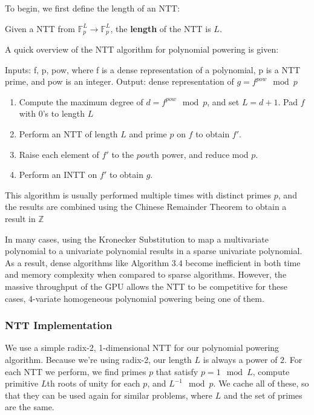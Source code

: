 To begin, we first define the length of an NTT:

\begin{defn}
    Given a NTT from $\mathbb{F}_p^L \rightarrow \mathbb{F}_p^L$, the \textbf{length} of the NTT is $L$.
\end{defn}

A quick overview of the NTT algorithm for polynomial powering is given:

\begin{alg} Inputs: f, p, pow, where f is a dense representation of a 
polynomial, p is a NTT prime, and pow is an integer.
Output: dense representation of $g = f ^ {pow} \mod p$

\begin{enumerate}
    \item Compute the maximum degree of $d = f ^ {pow} \mod p$, and set $L = d + 1$. Pad $f$ with $0$'s to length $L$
    \item Perform an NTT of length $L$ and prime $p$ on $f$ to obtain $f'$.
    \item Raise each element of $f'$ to the $pow$th power, and reduce mod $p$.
    \item Perform an INTT on $f'$ to obtain $g$.
\end{enumerate}

\end{alg}

This algorithm is usually performed multiple times with distinct primes $p$, and the results are combined using the Chinese Remainder Theorem to obtain a result in $\mathbb{Z}$

In many cases, using the Kronecker Substitution to map a multivariate polynomial to a univariate polynomial results in  a sparse univariate polynomial. As a result, dense algorithms like Algorithm 3.4 become inefficient in both time and memory complexity when compared to sparse algorithms. However, the massive throughput of the GPU allows the NTT to be competitive for these cases, $4$-variate homogeneous polynomial powering being one of them.

\subsubsection{NTT Implementation}

We use a simple radix-2, 1-dimensional NTT for our polynomial powering algorithm. Because we're using radix-2, our length $L$ is always a power of $2$. For each NTT we perform, we find primes $p$ that satisfy $p = 1 \mod L$, compute primitive $L$th roots of unity for each $p$, and $L^{-1} \mod p$. We cache all of these, so that they can be used again for similar problems, where $L$ and the set of primes are the same.

